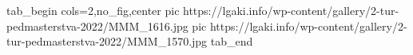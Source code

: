  
 
 
 
 


\ifcmt
  tab_begin cols=2,no_fig,center
     pic https://lgaki.info/wp-content/gallery/2-tur-pedmasterstva-2022/MMM_1616.jpg
		 pic https://lgaki.info/wp-content/gallery/2-tur-pedmasterstva-2022/MMM_1570.jpg
  tab_end
\fi
